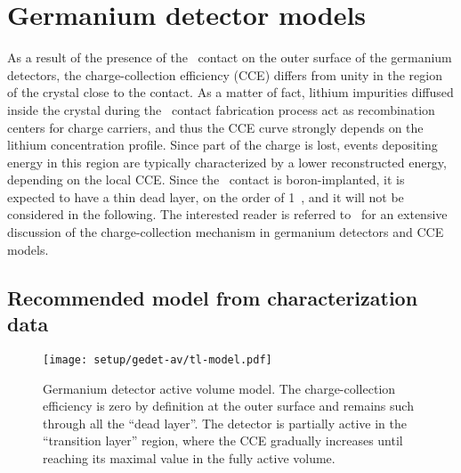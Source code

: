 
\chapter{Germanium detector models}%
\label{apdx:gedetav}

As a result of the presence of the \nplus\ contact on the outer surface of the germanium
detectors, the charge-collection efficiency (CCE) differs from unity in the region of the
crystal close to the contact. As a matter of fact, lithium impurities diffused inside the
crystal during the \nplus\ contact fabrication process act as recombination centers for
charge carriers, and thus the CCE curve strongly depends on the lithium concentration
profile. Since part of the charge is lost, events depositing energy in this region are
typically characterized by a lower reconstructed energy, depending on the local CCE. Since
the \pplus\ contact is boron-implanted, it is expected to have a thin dead layer, on the
order of 1~\mum, and it will not be considered in the following. The interested reader is
referred to~\cite{Lehnert2016} for an extensive discussion of the charge-collection
mechanism in germanium detectors and CCE models.

\section{Recommended model from characterization data}%
\label{sec:gedetav:chardata}

\begin{figure}
  \centering
  \texttt{[image: setup/gedet-av/tl-model.pdf]}
  \caption{%
    Germanium detector active volume model. The charge-collection efficiency is zero by
    definition at the outer surface and remains such through all the ``dead layer''. The
    detector is partially active in the ``transition layer'' region, where the CCE gradually
    increases until reaching its maximal value in the fully active volume.
  }\label{fig:gedetav:tl-model}
\end{figure}

